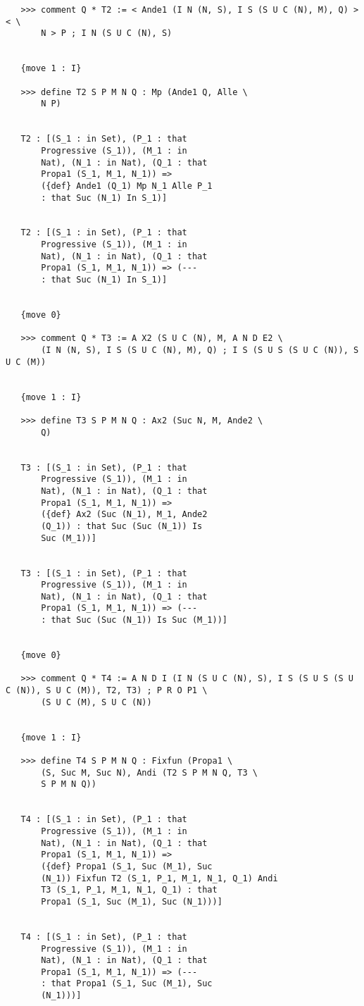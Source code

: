 \documentclass{article}
\begin{document}
\begin{verbatim}
   >>> comment Q * T2 := < Ande1 (I N (N, S), I S (S U C (N), M), Q) >< \
       N > P ; I N (S U C (N), S)


   {move 1 : I}

   >>> define T2 S P M N Q : Mp (Ande1 Q, Alle \
       N P)


   T2 : [(S_1 : in Set), (P_1 : that 
       Progressive (S_1)), (M_1 : in 
       Nat), (N_1 : in Nat), (Q_1 : that 
       Propa1 (S_1, M_1, N_1)) => 
       ({def} Ande1 (Q_1) Mp N_1 Alle P_1 
       : that Suc (N_1) In S_1)]


   T2 : [(S_1 : in Set), (P_1 : that 
       Progressive (S_1)), (M_1 : in 
       Nat), (N_1 : in Nat), (Q_1 : that 
       Propa1 (S_1, M_1, N_1)) => (--- 
       : that Suc (N_1) In S_1)]


   {move 0}

   >>> comment Q * T3 := A X2 (S U C (N), M, A N D E2 \
       (I N (N, S), I S (S U C (N), M), Q) ; I S (S U S (S U C (N)), S U C (M))


   {move 1 : I}

   >>> define T3 S P M N Q : Ax2 (Suc N, M, Ande2 \
       Q)


   T3 : [(S_1 : in Set), (P_1 : that 
       Progressive (S_1)), (M_1 : in 
       Nat), (N_1 : in Nat), (Q_1 : that 
       Propa1 (S_1, M_1, N_1)) => 
       ({def} Ax2 (Suc (N_1), M_1, Ande2 
       (Q_1)) : that Suc (Suc (N_1)) Is 
       Suc (M_1))]


   T3 : [(S_1 : in Set), (P_1 : that 
       Progressive (S_1)), (M_1 : in 
       Nat), (N_1 : in Nat), (Q_1 : that 
       Propa1 (S_1, M_1, N_1)) => (--- 
       : that Suc (Suc (N_1)) Is Suc (M_1))]


   {move 0}

   >>> comment Q * T4 := A N D I (I N (S U C (N), S), I S (S U S (S U C (N)), S U C (M)), T2, T3) ; P R O P1 \
       (S U C (M), S U C (N))


   {move 1 : I}

   >>> define T4 S P M N Q : Fixfun (Propa1 \
       (S, Suc M, Suc N), Andi (T2 S P M N Q, T3 \
       S P M N Q))


   T4 : [(S_1 : in Set), (P_1 : that 
       Progressive (S_1)), (M_1 : in 
       Nat), (N_1 : in Nat), (Q_1 : that 
       Propa1 (S_1, M_1, N_1)) => 
       ({def} Propa1 (S_1, Suc (M_1), Suc 
       (N_1)) Fixfun T2 (S_1, P_1, M_1, N_1, Q_1) Andi 
       T3 (S_1, P_1, M_1, N_1, Q_1) : that 
       Propa1 (S_1, Suc (M_1), Suc (N_1)))]


   T4 : [(S_1 : in Set), (P_1 : that 
       Progressive (S_1)), (M_1 : in 
       Nat), (N_1 : in Nat), (Q_1 : that 
       Propa1 (S_1, M_1, N_1)) => (--- 
       : that Propa1 (S_1, Suc (M_1), Suc 
       (N_1)))]



\end{verbatim}
\end{document}
